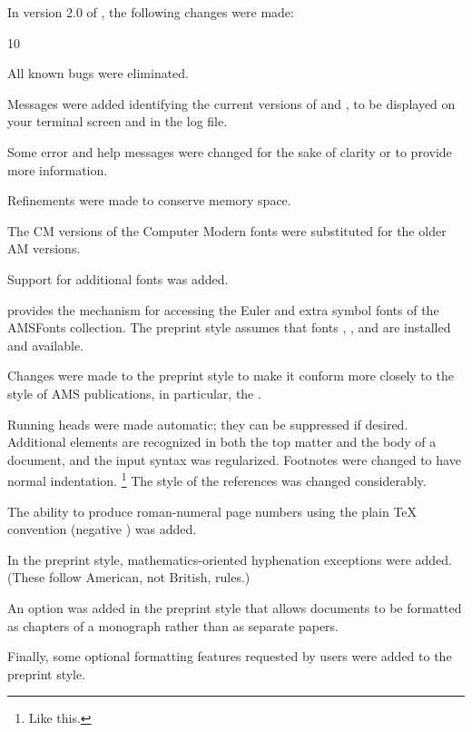 In version 2.0 of \AmSTeX{}, the following changes were made:
\widestnumber\item{10}
\roster
\item All known bugs were eliminated.
\item Messages were added identifying the current versions of
   and , to be displayed on your
  terminal screen and in the log file.
\item Some error and help messages were changed for the sake of
  clarity or to provide more information.
\item Refinements were made to conserve memory space.
\item The CM versions of the Computer Modern fonts were substituted for the
  older AM versions.
\item Support for additional fonts was added.

    provides the mechanism for accessing
    the Euler and extra symbol fonts of the AMSFonts collection.
   The preprint style assumes that fonts ,
    , and  are installed and available.

\item Changes were made to the preprint style to make it conform
  more closely to the style of AMS publications, in particular, the \JAMS.

   Running heads were made automatic; they can be suppressed
    if desired.
   Additional elements are recognized in both the top matter
    and the body of a document, and the input syntax was regularized.
   Footnotes were changed to have normal indentation.%
       \footnote{Like this.}
   The style of the references was changed considerably.

\item The ability to produce roman-numeral page numbers using the
  plain \TeX{} convention (negative ) was added.
\item In the preprint style, mathematics-oriented hyphenation exceptions
  were added.  (These follow American, not British, rules.)
\item An option was added in the preprint style that
  allows documents to be formatted
  as chapters of a monograph rather than as separate papers.
\item Finally, some optional formatting features requested by
  \AmSTeX{} users were added to the preprint style.
\endroster

